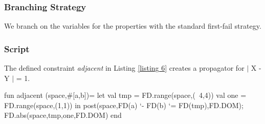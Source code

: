 \documentclass[a4paper,halfparskip]{scrartcl}
\begin{document}
\subsubsection{Branching Strategy}
We branch on the variables for the properties with the 
standard first-fail strategy. 

\subsubsection{Script}
The defined constraint \emph{adjacent} in Listing \ref{listing 6}
creates a propagator for $|$ X - Y $|$ = 1.
\begin{myverbatim}
fun adjacent (space,#[a,b])=
        let
           val tmp = FD.range(space,(~4,4))
           val one = FD.range(space,(1,1))
        in
           post(space,FD(a) `- FD(b) `= FD(tmp),FD.DOM);
           FD.abs(space,tmp,one,FD.DOM)
        end



\end{myverbatim}
\end{document}
